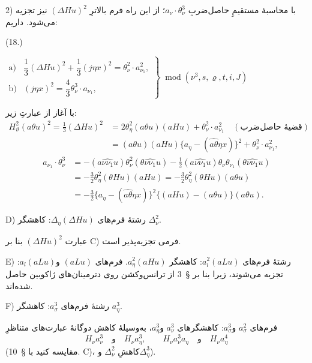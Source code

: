 \documentclass[11pt]{article}
\providecommand{\A}{\Delta}
\providecommand{\R}{\varrho}
\providecommand{\modu}[1]{\;\operatorname{mod} #1}
\begin{document}
2) با محاسبهٔ مستقیمِ حاصل‌ضربِ $a_\nu\cdot\theta_\nu^3$؛ از این راه فرم بالاترِ $(\A Hu)^2$ نیز تجزیه می‌شود. داریم:
\par\smallskip\noindent
\begin{minipage}[c]{4.8em}
\centering (18.)
\end{minipage}%
\begin{minipage}[c]{\dimexpr\linewidth-4.8em\relax}
\centering
\(\displaystyle
\left.\begin{array}{ll}
\text{a)}&\dfrac13(\A Hu)^2+\dfrac13(j\eta x)^2=\theta_\nu^2\cdot a_{\nu_1}^2,\\[0.6em]
\text{b)}&(j\eta x)^2=\dfrac43\theta_\nu^3\cdot a_{\nu_1},
\end{array}\right\}\modu{(\nu^3,s,\R,t,i,J)}
\)
\end{minipage}
\par\smallskip
با آغاز از عبارتِ زیر:
\[
\begin{aligned}
H_\vartheta^2(a\theta u)^2=\frac13(\A Hu)^2
&=2\theta_\eta^2(a\theta u)(aHu)+\theta_\nu^2\cdot a_{\nu_1}^2\quad(\text{قضیهٔ حاصل‌ضرب})\\
&=(a\theta u)(aHu)\{a_\eta-(\widehat{a\theta}\eta x)\}^2+\theta_\nu^2\cdot a_{\nu_1}^2,
\end{aligned}
\]
\[
\begin{aligned}
a_{\nu_1}\cdot\theta_\nu^3
&=-(a\widehat{\nu\nu_1}u)\theta_\nu^2(\theta\widehat{\nu\nu_1}u)-\frac12(a\widehat{\nu\nu_1}u)\theta_\nu\theta_{\nu_1}(\theta\widehat{\nu\nu_1}u)\\
&=-\frac32\theta_\eta^2(\theta Hu)(aHu)=-\frac32\theta_\eta^2(\theta Hu)(a\theta u)\\
&=-\frac32\{a_\eta-(\widehat{a\theta}\eta x)\}^2\{(aHu)-(a\theta u)\}(a\theta u).
\end{aligned}
\]

\noindent D) رشتهٔ فرم‌های $\A_\eta(\A Hu)$: کاهشگر $\A_\nu^2$.

عبارت $(\A Hu)^2$ بنا بر C) فرمی تجزیه‌پذیر است.

\noindent E) رشتهٔ فرم‌های $a_l^2(aLu)$: کاهشگر $a_\eta^2(aHu)$.
فرم‌های $(aLu)$ و$a_l(aLu)$: تجزیه می‌شوند، زیرا بنا بر \S\ 3 از ترانس‌وکشن روی دترمینان‌های ژاکوبین حاصل شده‌اند.

\noindent F) رشتهٔ فرم‌های $a_\sigma^3$: کاهشگر $a_\eta^3$.

فرم‌های $a_\sigma^2$ و$a_\sigma^3$: کاهشگرهای $a_\nu^3$ و$a_\eta^3$، به‌وسیلهٔ کاهش دوگانهٔ عبارت‌های متناظرِ
\[
H_\nu a_\nu^3\quad\text{و}\quad H_\nu a_\eta^3,
\qquad
H_\nu a_\nu^3a_\eta\quad\text{و}\quad H_\nu a_\eta^4
\]
(مقایسه کنید با \S\ 10. C)، کاهشِ $\A_\nu^2$ و$\A_\eta^3$).
\end{document}

